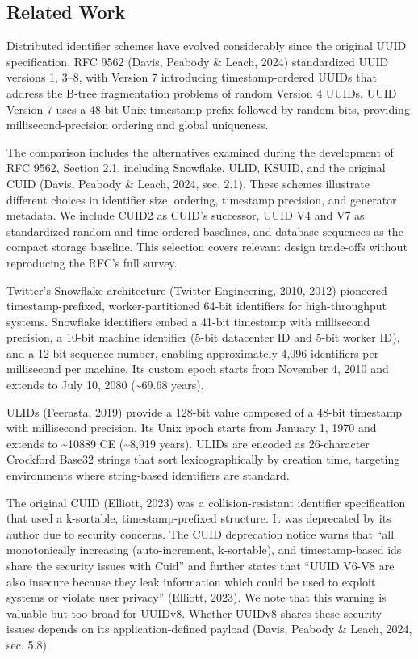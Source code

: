 \documentclass[fleqn,10pt,lineno]{wlpeerj}
\begin{document}
\subsection{Related Work}\label{related-work}

Distributed identifier schemes have evolved considerably since the
original UUID specification. RFC 9562 (Davis, Peabody \& Leach, 2024)
standardized UUID versions 1, 3--8, with Version 7 introducing
timestamp-ordered UUIDs that address the B-tree fragmentation problems
of random Version 4 UUIDs. UUID Version 7 uses a 48-bit Unix timestamp
prefix followed by random bits, providing millisecond-precision ordering
and global uniqueness.

The comparison includes the alternatives examined during the development
of RFC 9562, Section 2.1, including Snowflake, ULID, KSUID, and the
original CUID (Davis, Peabody \& Leach, 2024, sec. 2.1). These schemes
illustrate different choices in identifier size, ordering, timestamp
precision, and generator metadata. We include CUID2 as CUID's successor,
UUID V4 and V7 as standardized random and time-ordered baselines, and
database sequences as the compact storage baseline. This selection
covers relevant design trade-offs without reproducing the RFC's full
survey.

Twitter's Snowflake architecture (Twitter Engineering, 2010, 2012)
pioneered timestamp-prefixed, worker-partitioned 64-bit identifiers for
high-throughput systems. Snowflake identifiers embed a 41-bit timestamp
with millisecond precision, a 10-bit machine identifier (5-bit
datacenter ID and 5-bit worker ID), and a 12-bit sequence number,
enabling approximately 4,096 identifiers per millisecond per machine.
Its custom epoch starts from November 4, 2010 and extends to July 10,
2080 (\textasciitilde69.68 years).

ULIDs (Feerasta, 2019) provide a 128-bit value composed of a 48-bit
timestamp with millisecond precision. Its Unix epoch starts from January
1, 1970 and extends to \textasciitilde10889 CE (\textasciitilde8,919
years). ULIDs are encoded as 26-character Crockford Base32 strings that
sort lexicographically by creation time, targeting environments where
string-based identifiers are standard.

The original CUID (Elliott, 2023) was a collision-resistant identifier
specification that used a k-sortable, timestamp-prefixed structure. It
was deprecated by its author due to security concerns. The CUID
deprecation notice warns that ``all monotonically increasing
(auto-increment, k-sortable), and timestamp-based ids share the security
issues with Cuid'' and further states that ``UUID V6-V8 are also
insecure because they leak information which could be used to exploit
systems or violate user privacy'' (Elliott, 2023). We note that this
warning is valuable but too broad for UUIDv8. Whether UUIDv8 shares
these security issues depends on its application-defined payload (Davis,
Peabody \& Leach, 2024, sec. 5.8).
\end{document}
